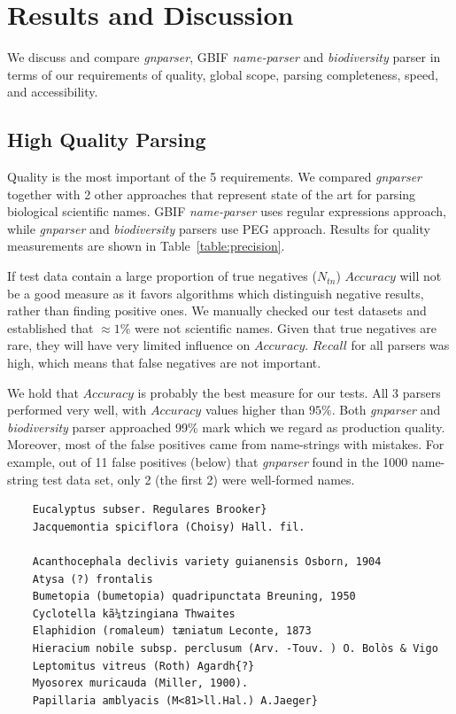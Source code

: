 \documentclass{bmcart}
\begin{document}
\section*{Results and Discussion}

We discuss and compare \textit{gnparser}, GBIF \textit{name-parser} and
\textit{biodiversity} parser in terms of our requirements of
quality, global scope, parsing completeness, speed, and accessibility. 


\subsection*{High Quality Parsing}

Quality is the most important  of the 5 requirements.  We
compared \textit{gnparser} together with 2 other approaches  that
represent state of the art for parsing biological scientific names. GBIF
\textit{name-parser} uses regular expressions approach, while \textit{gnparser}
and \textit{biodiversity} parsers use PEG approach.  Results for quality
measurements are shown in Table~\ref{table:precision}.

If test data contain a large proportion of true negatives ($N_{tn}$)
$Accuracy$ will not be a good measure as it favors algorithms which distinguish
negative results, rather than finding positive ones. We manually checked our test datasets and established that  $\approx1\%$ were not scientific names. Given that true negatives are rare, they will have very limited influence on $Accuracy$. $Recall$ for all parsers was high, which means that false negatives are not important. 

We hold that $Accuracy$ is probably the best measure
for our tests. All 3 parsers performed very well, with $Accuracy$
values higher than $95\%$. Both \textit{gnparser} and \textit{biodiversity}
parser approached 99\% mark which we regard as production quality. Moreover,
most of the false positives came from name-strings with mistakes. For example, out of 11 false positives (below) that \textit{gnparser} found in the 1000
name-string test data set, only 2 (the first 2) were well-formed names. 

\vspace{0.5cm}
\begin{verbatim} 
    Eucalyptus subser. Regulares Brooker}
    Jacquemontia spiciflora (Choisy) Hall. fil.

    Acanthocephala declivis variety guianensis Osborn, 1904
    Atysa (?) frontalis
    Bumetopia (bumetopia) quadripunctata Breuning, 1950
    Cyclotella kã¼tzingiana Thwaites
    Elaphidion (romaleum) tæniatum Leconte, 1873
    Hieracium nobile subsp. perclusum (Arv. -Touv. ) O. Bolòs & Vigo
    Leptomitus vitreus (Roth) Agardh{?}
    Myosorex muricauda (Miller, 1900).
    Papillaria amblyacis (M<81>ll.Hal.) A.Jaeger}
\end{verbatim}
\end{document}
